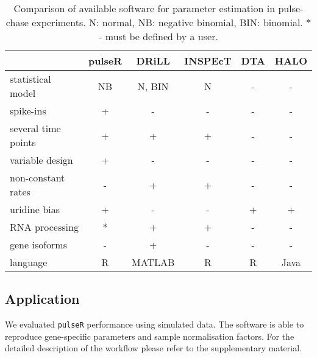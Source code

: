\begin{table}
 \begin{tabular}{|l|c|c|c|c|c|}\hline
                        &pulseR &DRiLL          &INSPEcT&DTA    &HALO       \\\hline
 statistical model      & NB    &N, BIN         &N       & -    & -      \\\hline                         
 spike-ins              & +     &   -           &  -     &  -    & -         \\\hline               
 several time points    & +     &   +           &  +     &  -    & -         \\\hline                    
  variable design       & +     &   -           &  -     &  -    & -         \\\hline 
 non-constant rates     & -     &   +           &  +     &  -    & -         \\\hline 
            uridine bias& +     &   -           &  -     &  +    & +         \\\hline 
       RNA processing   &$\ast$ &   +           &  +     &  -    & -         \\\hline 
       gene isoforms    & -     &   +           &  -     &  -    & -         \\\hline 
  language              & R     &MATLAB         &  R     &  R    & Java      \\\hline 
 \end{tabular}
\caption{Comparison of available software for parameter estimation in 
pulse-chase experiments. N: normal, NB: negative binomial, BIN: binomial.
$\ast$ - must be defined by a user.
}
\end{table}

\subsection{Application}
We evaluated \verb|pulseR| performance using simulated data. 
The software is able to reproduce gene-specific parameters and 
sample normalisation factors.
For the detailed
description of the workflow please refer to the supplementary material.

